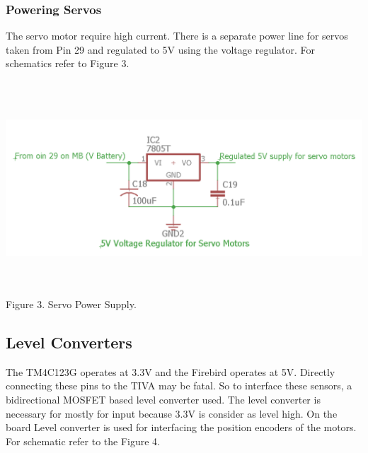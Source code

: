 \documentclass[a4paper,10pt,oneside]{article}
\begin{document}
{	\subsubsection{\textbf{Powering Servos}}
	{The servo motor require high current. There is a separate power line for servos taken from Pin 29 and regulated to 5V using the voltage regulator. For schematics refer to Figure 3.\\ }
	\begin{center}
	\includegraphics[width=18cm, 	height=8cm]{Images/ServoPowerSupply}\\			
	Figure 3. Servo Power Supply.
	\end{center}
	\subsection{\textbf{Level Converters}}
	{The TM4C123G operates at 3.3V and the Firebird operates at 5V. Directly connecting these pins to the TIVA may be fatal. So to interface these sensors, a bidirectional MOSFET based level converter used. The level converter is necessary for mostly for input because 3.3V is consider as level high. On the board Level converter is used for interfacing the position encoders of the motors. For schematic refer to the Figure 4.\\ }
		
}
\end{document}
